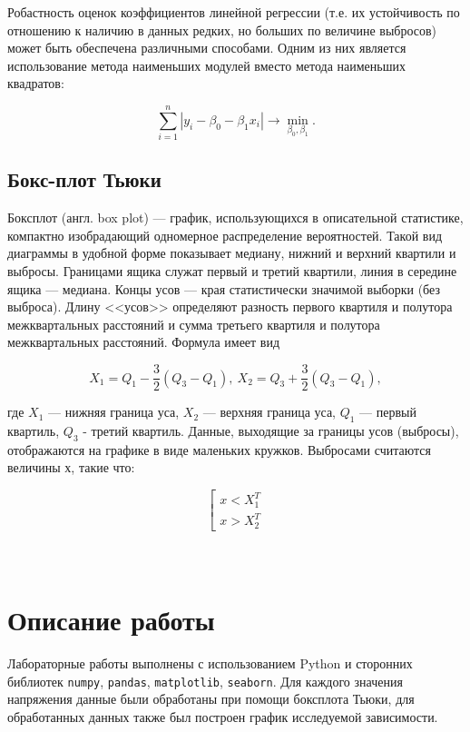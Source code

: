 \documentclass[12pt,a4paper]{article}
\begin{document}
Робастность оценок коэффициентов линейной регрессии (т.е. их
устойчивость по отношению к наличию в данных редких, но больших по
величине выбросов) может быть обеспечена различными способами. Одним из
них является использование метода наименьших модулей вместо метода
наименьших квадратов:

\begin{equation} \label{eq:lam}
    \sum \limits_{i=1}^n |y_i - \beta_0 - \beta_1 x_i| \rightarrow
    \min_{\beta_0, \beta_1}.
\end{equation}


\subsection{Бокс-плот Тьюки}
Боксплот (англ. box plot) — график, использующихся в описательной статистике, компактно изобрадающий одномерное распределение вероятностей. Такой вид диаграммы в удобной форме показывает медиану, нижний и верхний квартили и выбросы. Границами ящика служат первый и третий квартили, линия в середине ящика — медиана. Концы усов — края статистически значимой выборки (без выброса). Длину <<усов>> определяют разность первого квартиля и полутора межквартальных расстояний и сумма третьего квартиля и полутора межквартальных расстояний. Формула имеет вид

\begin{equation} \label{eq:box_plot}
X_1 = Q_1 - \frac{3}{2}(Q_3 - Q_1), \ X_2 = Q_3 + \frac{3}{2}(Q_3 - Q_1),
\end{equation}

где $X_1$ — нижняя граница уса, $X_2$ — верхняя граница уса, $Q_1$ — первый квартиль, $Q_3$ - третий квартиль.
Данные, выходящие за границы усов (выбросы), отображаются на графике в виде маленьких кружков.
Выбросами считаются величины $х$, такие что:

\begin{equation} \label{eq:outlier}
\left[
  \begin{array}{ll}
      x < X_1^T \\
      x > X_2^T
  \end{array}
\right .
\end{equation}\\\\
\section{Описание работы}
Лабораторные работы выполнены с использованием Python и сторонних
библиотек \verb!numpy!, \verb!pandas!, \verb!matplotlib!, \verb!seaborn!. Для каждого значения напряжения данные были обработаны при помощи боксплота Тьюки, для обработанных данных также был построен график исследуемой зависимости.
\end{document}
